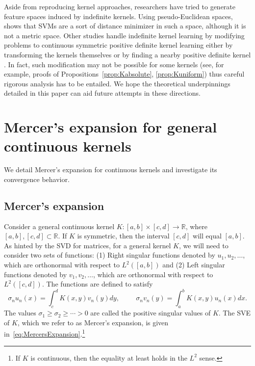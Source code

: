 \documentclass{article}
\begin{document}
Aside from reproducing kernel approaches, researchers have tried to generate feature spaces induced by indefinite kernels. Using pseudo-Euclidean spaces, \citep{haasdonk2005feature} shows that SVMs are a sort of distance minimizer in such a space, although it is not a metric space. Other studies handle indefinite kernel learning by modifying problems to continuous symmetric positive definite kernel learning either by transforming the kernels themselves \citep{wu2005analysis} or by finding a nearby positive definite kernel \citep{luss2007support}. In fact, such modification may not be possible for some kernels (see, for example, proofs of Propositions~\ref{prop:Kabsolute}, \ref{prop:Kuniform}) thus careful rigorous analysis has to be entailed. We hope the theoretical underpinnings detailed in this paper can aid future attempts in these directions. 

\section{Mercer's expansion for general continuous kernels}\label{sec:extensions}
We detail Mercer's expansion for continuous kernels and investigate its convergence behavior. 

\subsection{Mercer's expansion}
Consider a general continuous kernel $K:[a,b]\times [c,d]\rightarrow\mathbb{R}$, where $[a, b], [c, d]\subset\mathbb{R}$. If $K$ is symmetric, then the interval $[c,d]$ will equal $[a,b]$. As hinted by the SVD for matrices, for a general kernel $K$, we will need to consider two sets of functions: (1) Right singular functions denoted by $u_1,u_2,\ldots$, which are orthonormal with respect to $L^2([a,b])$ and (2) Left singular functions denoted by $v_1,v_2,\ldots$, which are orthonormal with respect to $L^2([c,d])$. The functions are defined to satisfy
\begin{equation}
    \sigma_n u_n(x) = \int_c^d K(x, y)v_n(y) dy, \hspace{1cm} \sigma_n v_n(y) = \int_a^b K(x, y) u_n(x) dx.
    \label{eq:IntegralDefinition}
\end{equation}
The values $\sigma_1\geq \sigma_2\geq\cdots>0$ are called the positive singular values of $K$. The SVE of $K$, which we refer to as Mercer's expansion, is given in~\cref{eq:MercersExpansion}.\footnote{If $K$ is continuous, then the equality at least holds in the $L^2$ sense.}
\end{document}
